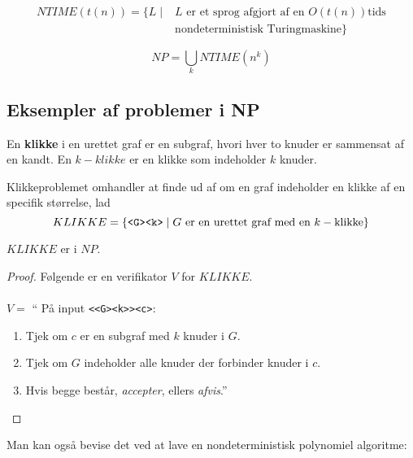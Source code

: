 \begin{definition}
	\begin{align*}
		NTIME(t(n)) = \{ L \mid & L \text{ er et sprog afgjort af en } O(t(n)) \text{tids} \\
		                        & \text{nondeterministisk Turingmaskine}\}
	\end{align*}
\end{definition}


\begin{corollary}
	\begin{equation*}
		NP = \bigcup_{k} NTIME(n^{k})
	\end{equation*}
\end{corollary}


\subsection{Eksempler af problemer i NP}%
\label{subsec:NPexamples}

En \textbf{klikke} i en urettet graf er en subgraf, hvori hver to knuder er sammensat af en kandt. En $k-klikke$ er en klikke som indeholder $k$ knuder.

Klikkeproblemet omhandler at finde ud af om en graf indeholder en klikke af en specifik størrelse, lad
\begin{equation*}
KLIKKE = \{\text{\texttt{<G><k>}} \mid G \text{ er en urettet graf med en } k-\text{klikke}\}
\end{equation*}

\begin{theorem}
$KLIKKE$ er i $NP$.
\end{theorem}

\begin{proof}
  Følgende er en verifikator $V$ for $KLIKKE$.\\\\
  \noindent
  $V = $ `` På input \texttt{<<G><k>><c>}:
  \begin{enumerate}
    \item Tjek om $c$ er en subgraf med $k$ knuder i $G$.
    \item Tjek om $G$ indeholder alle knuder der forbinder knuder i $c$.
    \item Hvis begge består, \textit{accepter}, ellers \textit{afvis}.''
  \end{enumerate}
\end{proof}

Man kan også bevise det ved at lave en nondeterministisk polynomiel algoritme:

